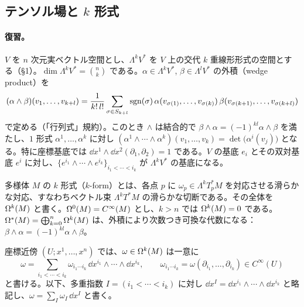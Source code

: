 \subsection{テンソル場と $k$ 形式}\label{B:ss:forms}

\paragraph{復習。}$V$ を $n$ 次元実ベクトル空間とし、$\Lambda^kV^*$ を $V$ 上の交代 $k$ 重線形形式の空間とする（§1）。$\dim\Lambda^kV^*=\binom nk$ である。$\alpha\in\Lambda^kV^*$, $\beta\in\Lambda^lV^*$ の外積（wedge product）を
\[
(\alpha\wedge\beta)(v_1,\dots,v_{k+l})=\frac1{k!\,l!}\sum_{\sigma\in S_{k+l}}\operatorname{sgn}(\sigma)\,\alpha(v_{\sigma(1)},\dots,v_{\sigma(k)})\,\beta(v_{\sigma(k+1)},\dots,v_{\sigma(k+l)})
\]
で定める（「行列式」規約）。このとき $\wedge$ は結合的で $\beta\wedge\alpha=(-1)^{kl}\alpha\wedge\beta$ を満たし、$1$ 形式 $\alpha^1,\dots,\alpha^k$ に対し $(\alpha^1\wedge\cdots\wedge\alpha^k)(v_1,\dots,v_k)=\det\bigl(\alpha^i(v_j)\bigr)$ となる。特に座標基底では $\dd x^1\wedge\dd x^2(\partial_1,\partial_2)=1$ である。$V$ の基底 $e_i$ とその双対基底 $e^i$ に対し、$\{e^{i_1}\wedge\cdots\wedge e^{i_k}\}_{i_1<\cdots<i_k}$ が $\Lambda^kV^*$ の基底になる。

\begin{defn}[$k$ 形式]\label{B:def:kform}
多様体 $M$ の $k$ 形式（$k$-form）とは、各点 $p$ に $\omega_p\in\Lambda^kT_p^*M$ を対応させる滑らかな対応、すなわちベクトル束 $\Lambda^kT^*M$ の滑らかな切断である。その全体を $\Omega^k(M)$ と書く。$\Omega^0(M)=C^\infty(M)$ とし、$k>n$ では $\Omega^k(M)=0$ である。$\Omega^*(M)=\bigoplus_{k=0}^n\Omega^k(M)$ は、外積により次数つき可換な代数になる：$\beta\wedge\alpha=(-1)^{kl}\alpha\wedge\beta$。
\end{defn}

座標近傍 $(U;x^1,\dots,x^n)$ では、$\omega\in\Omega^k(M)$ は一意に
\[
\omega=\sum_{i_1<\cdots<i_k}\omega_{i_1\cdots i_k}\,\dd x^{i_1}\wedge\cdots\wedge\dd x^{i_k},\qquad \omega_{i_1\cdots i_k}=\omega(\partial_{i_1},\dots,\partial_{i_k})\in C^\infty(U)
\]
と書ける。以下、多重指数 $I=(i_1<\cdots<i_k)$ に対し $\dd x^I=\dd x^{i_1}\wedge\cdots\wedge\dd x^{i_k}$ と略記し、$\omega=\sum_I\omega_I\,\dd x^I$ と書く。

